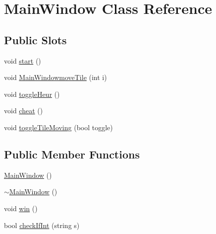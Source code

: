 \hypertarget{classMainWindow}{\section{\-Main\-Window \-Class \-Reference}
\label{classMainWindow}
}
\subsection*{\-Public \-Slots}
\begin{DoxyCompactItemize}
\item 
void \hyperlink{classMainWindow_a5edcbc314e782645cdf4db101eeb247d}{start} ()
\item 
void \hyperlink{classMainWindow_afe94590990ca2638aa3d77e20cc0e9a1}{\-Main\-Windowmove\-Tile} (int i)
\item 
void \hyperlink{classMainWindow_ab391954f6bce6502ef0be57895be82d4}{toggle\-Heur} ()
\item 
void \hyperlink{classMainWindow_a96ecb108845c078ecbe1afa1868f20df}{cheat} ()
\item 
void \hyperlink{classMainWindow_a86b2510c1e57282f441efc07e8a883dd}{toggle\-Tile\-Moving} (bool toggle)
\end{DoxyCompactItemize}
\subsection*{\-Public \-Member \-Functions}
\begin{DoxyCompactItemize}
\item 
\hyperlink{classMainWindow_a34c4b4207b46d11a4100c9b19f0e81bb}{\-Main\-Window} ()
\item 
\hyperlink{classMainWindow_ae98d00a93bc118200eeef9f9bba1dba7}{$\sim$\-Main\-Window} ()
\item 
void \hyperlink{classMainWindow_a86ac0b72af48169db0373c79d60b06b8}{win} ()
\item 
bool \hyperlink{classMainWindow_a52f550709c2f0993c3d3f344aa7369a4}{check\-If\-Int} (string s)
\end{DoxyCompactItemize}


